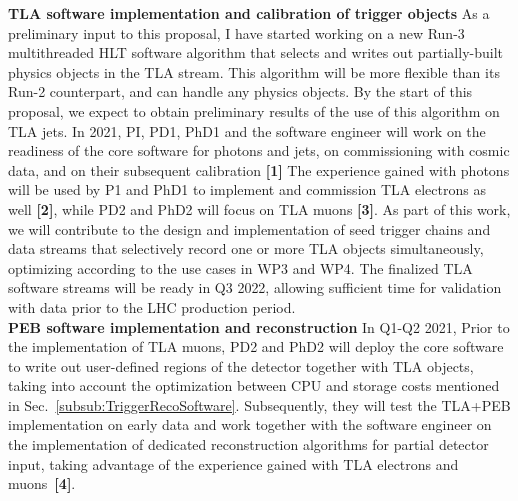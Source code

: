 \textbf{TLA software implementation and calibration of trigger objects} As a preliminary input to this proposal, I have started working on a new Run-3 multithreaded HLT software algorithm that selects and writes out partially-built physics objects in the TLA stream. 
This algorithm will be more flexible than its Run-2 counterpart, and can handle any physics objects. 
By the start of this proposal, we expect to obtain preliminary results of the use of this algorithm on TLA jets. 
In 2021, PI, PD1, PhD1 and the software engineer
will work on the readiness of the core software for photons and jets, on commissioning with cosmic data, and on their subsequent calibration \textbf{[1]}
The experience gained with photons will be used by P1 and PhD1 to implement and commission TLA electrons as well \textbf{[2]}, while PD2 and PhD2 will focus on TLA muons \textbf{[3]}. 
As part of this work, we will contribute to the design and implementation of seed trigger chains and data streams that selectively record one or more TLA objects simultaneously, optimizing according to the use cases in WP3 and WP4. 
The finalized TLA software streams will be ready in Q3 2022, allowing sufficient time for validation with data prior to the LHC production period. \\
\textbf{PEB software implementation and reconstruction} In Q1-Q2 2021, Prior to the implementation of TLA muons, PD2 and PhD2 will deploy the core software to write out user-defined regions of the detector together with TLA objects, 
taking into account the optimization between CPU and storage costs mentioned in Sec.~\ref{subsub:TriggerRecoSoftware}. 
Subsequently, they will test the TLA+PEB implementation on early data and work together with the software engineer on the implementation of dedicated reconstruction algorithms for partial detector input, taking advantage of the experience gained with TLA electrons and muons~\textbf{[4]}. 
